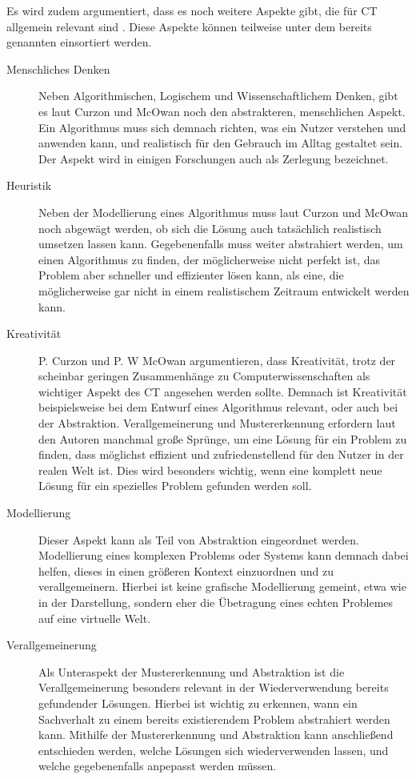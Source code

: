 Es wird zudem argumentiert, dass es noch weitere Aspekte gibt, die für CT allgemein relevant sind \cite{curzon}. Diese Aspekte können teilweise unter dem bereits genannten einsortiert werden.

\begin{description}
    \item[Menschliches Denken] Neben Algorithmischen, Logischem und Wissenschaftlichem Denken, gibt es laut Curzon und McOwan \cite{curzon} noch den abstrakteren, menschlichen Aspekt. Ein Algorithmus muss sich demnach richten, was ein Nutzer verstehen und anwenden kann, und realistisch für den Gebrauch im Alltag gestaltet sein. Der Aspekt wird in einigen Forschungen auch als Zerlegung bezeichnet.
    \item[Heuristik] Neben der Modellierung eines Algorithmus muss laut Curzon und McOwan noch abgewägt werden, ob sich die Lösung auch tatsächlich realistisch umsetzen lassen kann. Gegebenenfalls muss weiter abstrahiert werden, um einen Algorithmus zu finden, der möglicherweise nicht perfekt ist, das Problem aber schneller und effizienter lösen kann, als eine, die möglicherweise gar nicht in einem realistischem Zeitraum entwickelt werden kann.
    \item[Kreativität] P. Curzon und P. W McOwan argumentieren, dass Kreativität, trotz der scheinbar geringen Zusammenhänge zu Computerwissenschaften als wichtiger Aspekt des  CT angesehen werden sollte. Demnach ist Kreativität beispielsweise bei dem Entwurf eines Algorithmus relevant, oder auch bei der Abstraktion. Verallgemeinerung und Mustererkennung erfordern laut den Autoren manchmal große Sprünge, um eine Lösung für ein Problem zu finden, dass möglichst effizient und zufriedenstellend für den Nutzer in der realen Welt ist. Dies wird besonders wichtig, wenn eine komplett neue Lösung für ein spezielles Problem gefunden werden soll.
    \item[Modellierung] Dieser Aspekt kann als Teil von Abstraktion eingeordnet werden. Modellierung eines komplexen Problems oder Systems kann demnach dabei helfen, dieses in einen größeren Kontext einzuordnen und zu verallgemeinern. Hierbei ist keine grafische Modellierung gemeint, etwa wie in der Darstellung, sondern eher die Übetragung eines echten Problemes auf eine virtuelle Welt.
    \item[Verallgemeinerung] Als Unteraspekt der Mustererkennung und Abstraktion ist die Verallgemeinerung besonders relevant in der Wiederverwendung bereits gefundender Lösungen. Hierbei ist wichtig zu erkennen, wann ein Sachverhalt zu einem bereits existierendem Problem abstrahiert werden kann. Mithilfe der Mustererkennung und Abstraktion kann anschließend entschieden werden, welche Lösungen sich wiederverwenden lassen, und welche gegebenenfalls anpepasst werden müssen.

\end{description}
